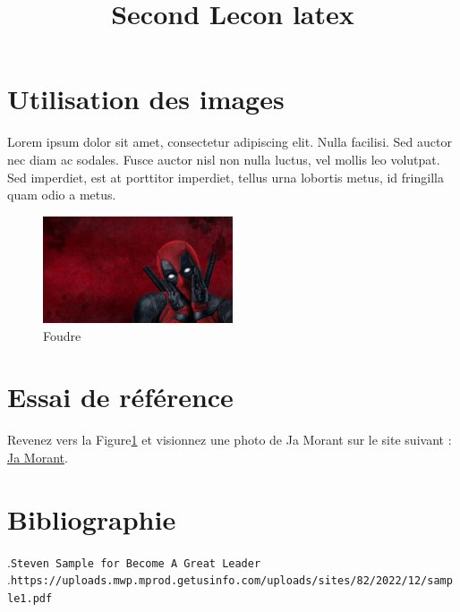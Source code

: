 \documentclass[lipt]{article}
\begin{document}
	\title{Second Lecon latex}
	\section{Utilisation des images}
	
	Lorem ipsum dolor sit amet, consectetur adipiscing elit. Nulla facilisi. Sed auctor nec diam ac sodales. Fusce auctor nisl non nulla luctus, vel mollis leo volutpat. Sed imperdiet, est at porttitor imperdiet, tellus urna lobortis metus, id fringilla quam odio a metus. 
	
	\begin{figure}[ht]
		\centering
		\includegraphics[width=0.5\textwidth]{photo2.jpg}
		\caption{Foudre}
		\label{fig:deadpool}
	\end{figure}
	
\newpage
	
\section{Essai de référence}
	
	Revenez vers la Figure\ref{fig:deadpool} et visionnez une photo de Ja Morant sur le site suivant : \href{https://images.app.goo.gl/bccK235QowFbMqBF6}{Ja Morant}.
	
\section{Bibliographie}
.\nolinkurl{Steven Sample for Become A Great Leader}\\
.\nolinkurl{https://uploads.mwp.mprod.getusinfo.com/uploads/sites/82/2022/12/sample1.pdf}\\

\renewcommand{\bibname}{References}
\notice{*}


\end{document}
